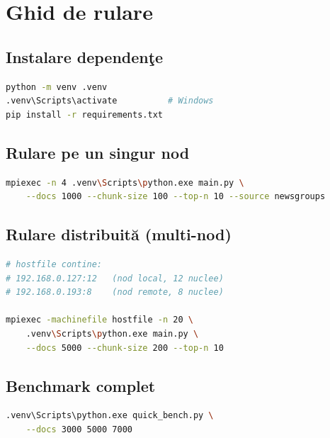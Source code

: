 \documentclass[a4paper,12pt]{report}
\begin{document}
\appendix
\chapter{Ghid de rulare}

\section*{Instalare dependen\c{t}e}
\begin{lstlisting}[language=bash, caption={Instalare mediu virtual}]
python -m venv .venv
.venv\Scripts\activate          # Windows
pip install -r requirements.txt
\end{lstlisting}

\section*{Rulare pe un singur nod}
\begin{lstlisting}[language=bash, caption={Rulare locala cu 4 procese}]
mpiexec -n 4 .venv\Scripts\python.exe main.py \
    --docs 1000 --chunk-size 100 --top-n 10 --source newsgroups
\end{lstlisting}

\section*{Rulare distribuit\u{a} (multi-nod)}
\begin{lstlisting}[language=bash, caption={Rulare distribuita cu hostfile}]
# hostfile contine:
# 192.168.0.127:12   (nod local, 12 nuclee)
# 192.168.0.193:8    (nod remote, 8 nuclee)

mpiexec -machinefile hostfile -n 20 \
    .venv\Scripts\python.exe main.py \
    --docs 5000 --chunk-size 200 --top-n 10
\end{lstlisting}

\section*{Benchmark complet}
\begin{lstlisting}[language=bash, caption={Benchmark cu grafice}]
.venv\Scripts\python.exe quick_bench.py \
    --docs 3000 5000 7000
\end{lstlisting}
\end{document}
